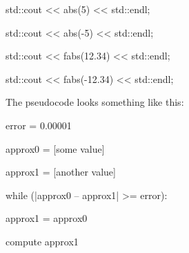 \begin{console}

std::cout << abs(5) << std::endl;

std::cout << abs(-5) << std::endl;

std::cout << fabs(12.34) << std::endl;

std::cout << fabs(-12.34) << std::endl; 

\end{console}



The pseudocode looks something like this:

\begin{console}

error = 0.00001

approx0 = [some value]

approx1 = [another value]

while (|approx0 -- approx1| >= error):

      approx1 = approx0

      compute approx1 

\end{console}

